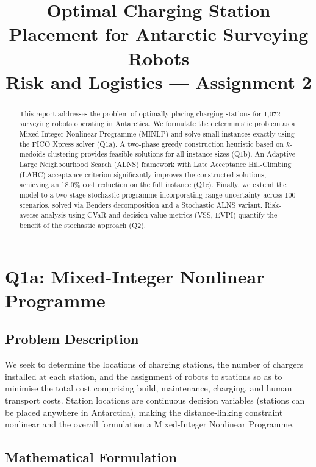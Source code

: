 \documentclass[11pt,a4paper]{article}
\title{Optimal Charging Station Placement for Antarctic Surveying Robots\\[6pt]
       \large Risk and Logistics --- Assignment 2}
\author{} %
\date{}
\begin{document}
\maketitle

\begin{abstract}
This report addresses the problem of optimally placing charging stations for 1,072 surveying robots operating in Antarctica.
We formulate the deterministic problem as a Mixed-Integer Nonlinear Programme (MINLP) and solve small instances exactly using the FICO Xpress solver (Q1a).
A two-phase greedy construction heuristic based on $k$-medoids clustering provides feasible solutions for all instance sizes (Q1b).
An Adaptive Large Neighbourhood Search (ALNS) framework with Late Acceptance Hill-Climbing (LAHC) acceptance criterion significantly improves the constructed solutions, achieving an 18.0\% cost reduction on the full instance (Q1c).
Finally, we extend the model to a two-stage stochastic programme incorporating range uncertainty across 100 scenarios, solved via Benders decomposition and a Stochastic ALNS variant.
Risk-averse analysis using CVaR and decision-value metrics (VSS, EVPI) quantify the benefit of the stochastic approach (Q2).
\end{abstract}

\tableofcontents
\newpage

\section{Q1a: Mixed-Integer Nonlinear Programme}
\label{sec:q1a}

\subsection{Problem Description}

We seek to determine the locations of charging stations, the number of chargers installed at each station, and the assignment of robots to stations so as to minimise the total cost comprising build, maintenance, charging, and human transport costs.
Station locations are continuous decision variables (stations can be placed anywhere in Antarctica), making the distance-linking constraint nonlinear and the overall formulation a Mixed-Integer Nonlinear Programme.

\subsection{Mathematical Formulation}
\label{sec:q1a-model}
\end{document}
